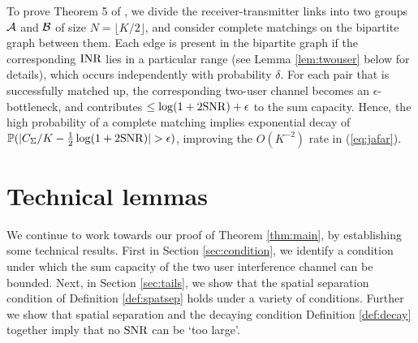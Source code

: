 \documentclass[journal]{IEEEtran}
\begin{document}
To prove Theorem 5 of \cite{jafar},
we divide the receiver-transmitter links 
into two groups ${\mathcal{A}}$ and ${\mathcal{B}}$ of 
size $N = \lfloor K/2 \rfloor$, and consider complete matchings on the bipartite graph between
them. Each edge is present in the bipartite graph if the corresponding ${\rm{INR}}$ lies 
in a particular range (see Lemma \ref{lem:twouser} below for details), 
which occurs independently with probability
$\delta$.
For each pair that is successfully matched up, the corresponding two-user channel becomes an 
$\epsilon$-bottleneck, and
contributes $\leq \log (1+ 2 {\rm{SNR}}) + \epsilon$ to the sum
capacity. Hence, the high probability of a complete matching implies exponential decay of
${\mathbb {P}}(|C_{\Sigma}/K - \frac{1}{2} \log(1+2 {\rm{SNR}})| > \epsilon)$, improving the $O(K^{-2})$ rate 
in (\ref{eq:jafar}).
%
\section{Technical lemmas} \label{sec:proofupper}
%
We continue to work towards 
our proof of Theorem \ref{thm:main}, by establishing some technical results. First in Section
\ref{sec:condition}, we identify a condition under which the sum capacity of
the two user interference channel can be bounded. Next, in Section \ref{sec:tails},
 we show that the spatial separation condition of
Definition \ref{def:spatsep} holds under a variety of conditions. Further we show that
spatial separation 
and the decaying condition Definition \ref{def:decay}
together imply that 
no ${\rm{SNR}}$ can be `too large'. 
%
\end{document}
